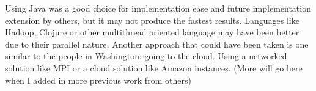 \documentclass[12pt]{article}
\begin{document}
Using Java was a good choice for implementation ease and future implementation
extension by others, but it may not produce the fastest results. Languages
like Hadoop, Clojure or other multithread oriented language may have been better
due to their parallel nature. Another approach that could have been taken is one
similar to the people in Washington: going to the cloud. Using a networked 
solution like MPI or a cloud solution like Amazon instances. (More will go here
when I added in more previous work from others)

\begin{thebibliography}{1}

\end{thebibliography}
\end{document}
